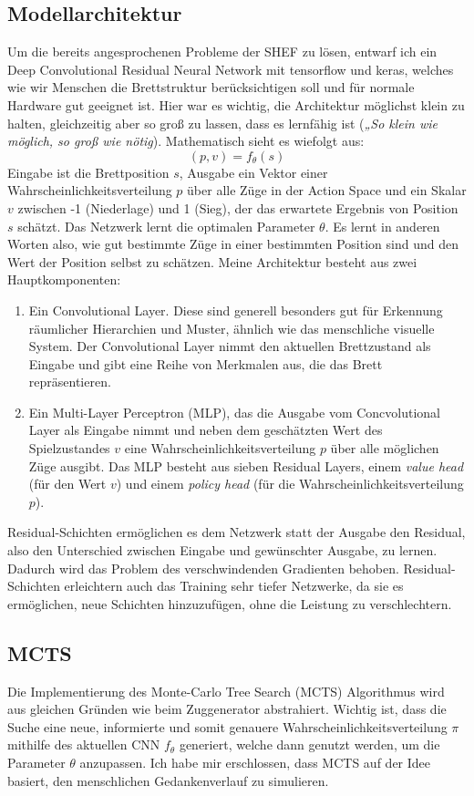 \documentclass{jpp}
\begin{document}
\subsection{Modellarchitektur}
Um die bereits angesprochenen Probleme der SHEF zu lösen, entwarf ich ein Deep Convolutional Residual Neural Network mit tensorflow und keras, welches wie wir Menschen die Brettstruktur berücksichtigen soll und für normale Hardware gut geeignet ist. Hier war es wichtig, die Architektur möglichst klein zu halten, gleichzeitig aber so groß zu lassen, dass es lernfähig ist (\textit{„So klein wie möglich, so groß wie nötig}). Mathematisch sieht es wiefolgt aus:
\[(p, v) =  f_\theta(s)\]Eingabe ist die Brettposition $s$, Ausgabe ein Vektor einer Wahrscheinlichkeitsverteilung $p$ über alle Züge in der Action Space und ein Skalar $v$ zwischen -1 (Niederlage) und 1 (Sieg), der das erwartete Ergebnis von Position $s$ schätzt. Das Netzwerk lernt die optimalen Parameter $\theta$. Es lernt in anderen Worten also, wie gut bestimmte Züge in einer bestimmten Position sind und den Wert der Position selbst zu schätzen. 
Meine Architektur besteht aus zwei Hauptkomponenten:
\begin{enumerate}
\item Ein Convolutional Layer. Diese sind generell besonders gut für Erkennung räumlicher Hierarchien und Muster, ähnlich wie das menschliche visuelle System. Der Convolutional Layer nimmt den aktuellen Brettzustand als Eingabe und gibt eine Reihe von Merkmalen aus, die das Brett repräsentieren.
\item Ein Multi-Layer Perceptron (MLP), das die Ausgabe vom Concvolutional Layer als Eingabe nimmt und neben dem geschätzten Wert des Spielzustandes $v$ eine Wahrscheinlichkeitsverteilung $p$ über alle möglichen Züge ausgibt. Das MLP besteht aus sieben Residual Layers, einem \textit{value head} (für den Wert $v$) und einem \textit{policy head} (für die Wahrscheinlichkeitsverteilung $p$). 
\end{enumerate}
Residual-Schichten ermöglichen es dem Netzwerk statt der Ausgabe den Residual, also den Unterschied zwischen Eingabe und gewünschter Ausgabe, zu lernen. Dadurch wird das Problem des verschwindenden Gradienten behoben. Residual-Schichten erleichtern auch das Training sehr tiefer Netzwerke, da sie es ermöglichen, neue Schichten hinzuzufügen, ohne die Leistung zu verschlechtern. 

\subsection{MCTS}
Die Implementierung des Monte-Carlo Tree Search (MCTS) Algorithmus \cite{mcts} wird aus gleichen Gründen wie beim Zuggenerator abstrahiert. Wichtig ist, dass die Suche eine neue, informierte und somit genauere Wahrscheinlichkeitsverteilung $\pi$ mithilfe des aktuellen CNN $f_\theta$ generiert, welche dann genutzt werden, um die Parameter $\theta$ anzupassen. Ich habe mir erschlossen, dass MCTS auf der Idee basiert, den menschlichen Gedankenverlauf zu simulieren.
\end{document}
